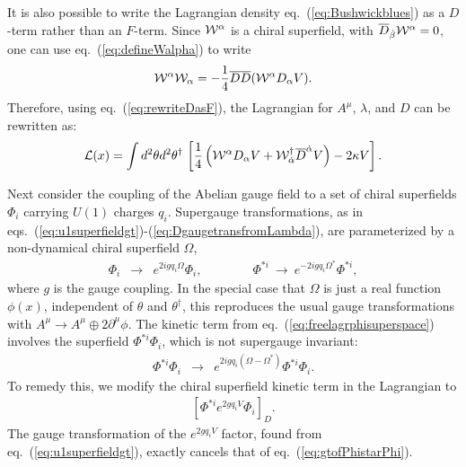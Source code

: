 \documentclass[12pt]{article}
\def\BDminus{-}
\def\BDminus{+}
\def\BDminus{\ominus}
\def\BDminus{\oplus}
\def\beq{\begin{eqnarray}}
\def\eeq{\end{eqnarray}}
\def\Dcon{\overline D}
\begin{document}
It is also possible to write the Lagrangian density eq.~(\ref{eq:Bushwickblues}) 
as a $D$-term rather 
than an $F$-term. Since ${\cal W}^\alpha$ is a chiral superfield, with 
$\Dcon_{\dot \beta} {\cal W}^\alpha = 0$, one can use 
eq.~(\ref{eq:defineWalpha}) to write
\beq
{\cal W}^\alpha {\cal W}_\alpha = 
-\frac{1}{4} \Dcon\Dcon ({\cal W}^\alpha D_\alpha V).
\eeq
Therefore, using eq.~(\ref{eq:rewriteDasF}), 
the Lagrangian for $A^\mu$, $\lambda$, and $D$ can be rewritten as:
\beq
{\cal L}(x) = \int d^2\theta d^2\theta^\dagger \, \left [
\frac{1}{4}
\left (
{\cal W}^\alpha D_\alpha V 
+ {\cal W}^\dagger_{\dot\alpha} \Dcon^{\dot\alpha} V \right ) - 2 \kappa V
\right ].
\eeq


Next consider the coupling of the Abelian gauge field to a set of chiral 
superfields $\Phi_i$ carrying $U(1)$ charges $q_i$. Supergauge transformations, as in 
eqs.~(\ref{eq:u1superfieldgt})-(\ref{eq:DgaugetransfromLambda}), are 
parameterized by a non-dynamical chiral 
superfield $\Omega$,
\beq
\Phi_i &\rightarrow& e^{2ig q_i \Omega} \Phi_i ,
\qquad\qquad
\Phi^{*i} \>\rightarrow\> e^{-2ig q_i \Omega^*} \Phi^{*i} ,
\eeq
where $g$ is the gauge coupling. 
In the special case that $\Omega$ is 
just a real function $\phi(x)$, independent of $\theta$ and $\theta^\dagger$, 
this reproduces the usual gauge transformations with $A^\mu \rightarrow 
A^\mu \BDminus 2 \partial^\mu \phi$. 
The kinetic term 
from eq.~(\ref{eq:freelagrphisuperspace}) 
involves the superfield 
$\Phi^{*i} \Phi_i$, which is not supergauge invariant:
\beq
\Phi^{*i} \Phi_i &\rightarrow& 
e^{2ig q_i(\Omega - \Omega^*)} \Phi^{*i} \Phi_i .
\label{eq:gtofPhistarPhi}
\eeq
To remedy this, we modify the chiral superfield kinetic term in the Lagrangian to
\beq
\left [ \Phi^{*i} e^{2 g q_i V} \Phi_i \right ]_D .
\eeq
The gauge transformation of the 
$e^{2 g q_i V}$ factor, found from 
eq.~(\ref{eq:u1superfieldgt}),
exactly cancels that 
of eq.~(\ref{eq:gtofPhistarPhi}).
\end{document}
